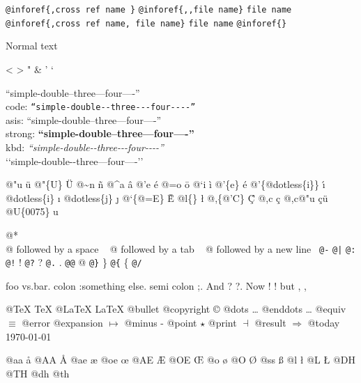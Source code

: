 \documentclass{book}
\begin{document}
\texttt{@inforef\{,cross ref name \}} 
\texttt{@inforef\{,,file name\}} \texttt{file name}
\texttt{@inforef\{,cross ref name, file name\}} \texttt{file name}
\texttt{@inforef\{\}} 



Normal text

<
>
"
\&
'
`

``simple-double--three---four----''\leavevmode{}\\
code: \texttt{``simple-double{-}{-}three{-}{-}{-}four{-}{-}{-}-''} \leavevmode{}\\
asis: ``simple-double--three---four----'' \leavevmode{}\\
strong: \textbf{``simple-double--three---four----''} \leavevmode{}\\
kbd: {\ttfamily\textsl{``simple-double{-}{-}three{-}{-}{-}four{-}{-}{-}-''}} \leavevmode{}\\

`\hbox{}`simple-double-\hbox{}-three---four----'\hbox{}'\leavevmode{}\\

%
%
%
%

@"u \"{u} 
@"\{U\} \"{U} 
@\~{}n \~{n}
@\^{}a \^{a}
@'e \'{e}
@=o \={o}
@`i \`{i}
@'\{e\} \'{e}
@'\{@dotless\{i\}\} \'{\i{}} 
@dotless\{i\} \i{}
@dotless\{j\} \j{}
@`\{@=E\} \`{\={E}} 
@l\{\} \l{}
@,\{@'C\} \c{\'{C}}
@,c \c{c}
@,c@"u \c{c}\"{u} \leavevmode{}\\

@U\{0075\} u

@* \leavevmode{}\\
@ followed by a space
\ {}
@ followed by a tab
\ {}
@ followed by a new line
\ {}\texttt{@-} \-{}
\texttt{@|} 
\texttt{@:} \@
\texttt{@!} \@!
\texttt{@?} \@?
\texttt{@.} \@.
\texttt{@@} @
\texttt{@\}} \}
\texttt{@\{} \{
\texttt{@/} 

foo vs.\@ bar. 
colon :\@And something else.
semi colon ;\@.
And ? ?\@.
Now ! !\@@
but , ,\@

@TeX \TeX{}
@LaTeX \LaTeX{}
@bullet \textbullet{}
@copyright \copyright{}
@dots \dots{}\@
@enddots \dots{}
@equiv $\equiv{}$
@error 
@expansion $\mapsto{}$
@minus -
@point $\star{}$
@print $\dashv{}$
@result $\Rightarrow{}$
@today \today{}

@aa \aa{}
@AA \AA{}
@ae \ae{}
@oe \oe{}
@AE \AE{}
@OE \OE{}
@o \o{}
@O \O{}
@ss \ss{}
@l \l{}
@L \L{}
@DH \DH{}
@TH \TH{}
@dh \dh{}
@th \th{}
\end{document}
